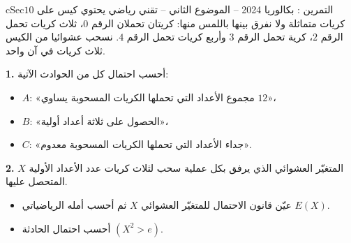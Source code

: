\documentclass[12pt,a4paper]{article}
\newenvironment{BOX}[2]{\begin{otherlanguage}{english}\begin{arbox}{#1}{#2}}{\end{arbox}\end{otherlanguage}}
\newcounter{exo}
\newenvironment{tamrin}[1]{\stepcounter{exo}\begin{BOX}{cSec}{التمرين \theexo: #1}}{\end{BOX}}
\newenvironment{sq}{\begin{itemize}[leftmargin=2.4em,itemsep=3pt]}{\end{itemize}}
\newcommand{\qa}{\item[(أ)]}\newcommand{\qb}{\item[(ب)]}\newcommand{\qc}{\item[(جـ)]}\newcommand{\qd}{\item[(د)]}\newcommand{\qe}{\item[(هـ)]}
\newcommand{\QQ}[1]{\par\smallskip\textbf{#1.} }
\begin{document}
\begin{tamrin}{بكالوريا 2024 -- الموضوع الثاني -- تقني رياضي}
يحتوي كيس على $10$ كريات متماثلة ولا نفرق بينها باللمس منها: كريتان تحملان الرقم $0$، ثلاث كريات تحمل الرقم $2$، كرية تحمل الرقم $3$ وأربع كريات تحمل الرقم $4$. نسحب عشوائيا من الكيس ثلاث كريات في آن واحد.
\QQ{1} أحسب احتمال كل من الحوادث الآتية:
\begin{itemize}
\item $A$: «مجموع الأعداد التي تحملها الكريات المسحوبة يساوي $12$»،
\item $B$: «الحصول على ثلاثة أعداد أولية»،
\item $C$: «جداء الأعداد التي تحملها الكريات المسحوبة معدوم».
\end{itemize}
\QQ{2} $X$ المتغيّر العشوائي الذي يرفق بكل عملية سحب لثلاث كريات عدد الأعداد الأولية المتحصل عليها.
\begin{sq}
\qa عيّن قانون الاحتمال للمتغيّر العشوائي $X$ ثم أحسب أمله الرياضياتي $E(X)$.
\qb أحسب احتمال الحادثة $(X^2>e)$.
\end{sq}
\end{tamrin}
\end{document}
